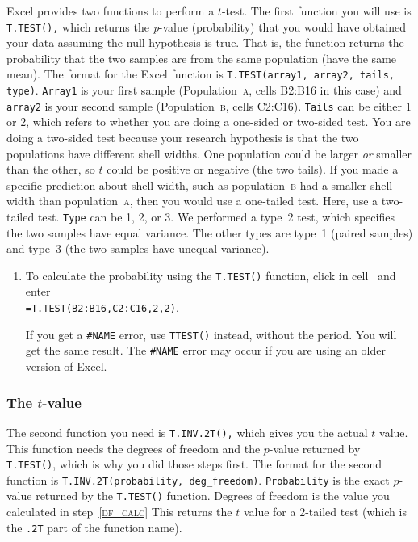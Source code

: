 \documentclass[12pt]{exam}
\newcommand*\Popa{Population~\textsc{a}}
\newcommand*\Popb{Population~\textsc{b}}
\newcommand*\popa{population~\textsc{a}} %
\newcommand*\popb{population~\textsc{b}} %
\newcommand*\xcell[1]{cell~\liningnum{#1}}
\begin{document}
Excel provides two functions to perform a $t$-test. The first function you will use is \texttt{T.TEST(),} which returns the \emph{p}-value (probability) that you would have obtained your data assuming the null hypothesis is true. That is, the function returns the probability that the two samples are from the same population (have the same mean).  The format for the Excel function is \texttt{T.TEST(array1, array2, tails, type)}. \texttt{Array1} is your first sample (\Popa, cells {\liningnum B2:B16} in this case) and \texttt{array2} is your second sample (\Popb, cells {\liningnum C2:C16}). \texttt{Tails} can be either 1 or 2, which refers to whether you are doing a one-sided or two-sided test. You are doing a two-sided test because your research hypothesis is that the two populations have different shell widths. One population could be larger \emph{or} smaller than the other, so $t$ could be positive or negative (the two tails). If you made a specific prediction about shell width, such as \popb{} had a smaller shell width than \popa, then you would use a one-tailed test. Here, use a two-tailed test.  \texttt{Type} can be 1, 2, or 3. We performed a type~2 test, which specifies the two samples have equal variance. The other types are type~1 (paired samples) and type~3 (the two samples have unequal variance).

\begin{enumerate}[resume]
	\item To calculate the probability using the \texttt{T.TEST()} function, click in \xcell{B21} and enter\\ \texttt{=T.TEST(B2:B16,C2:C16,2,2)}. 
	
	If you get a \texttt{\#NAME} error, use \texttt{TTEST()} instead, without the period. You will get the same result. The \texttt{\#NAME} error may occur if you are using an older version of Excel. 

\end{enumerate}

\subsubsection*{The $t$-value}

The second function you need is \texttt{T.INV.2T(),} which gives you the actual $t$ value. This function needs the degrees of freedom and the $p$-value returned by \texttt{T.TEST()}, which is why you did those steps first. The format for the second function is \texttt{T.INV.2T(probability, deg\_freedom)}. \texttt{Probability} is the exact $p$-value returned by the \texttt{T.TEST()} function. Degrees of freedom is the value you calculated in step~\textsc{\ref{df_calc}} This returns the $t$ value for a 2-tailed test (which is the \texttt{.2T} part of the function name).
\end{document}
